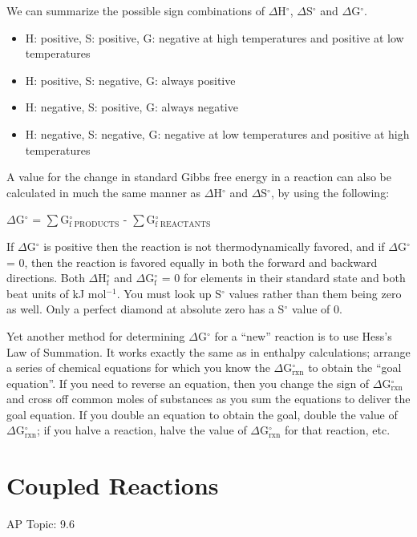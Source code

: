 \documentclass[../chem.tex]{subfiles}
\begin{document}
We can summarize the possible sign combinations of $\Delta$H$^{\circ}$, $\Delta$S$^{\circ}$ and $\Delta$G$^{\circ}$.
\begin{itemize}
    \item H: positive, S: positive, G: negative at high temperatures and positive at low temperatures 
    \item H: positive, S: negative, G: always positive 
    \item H: negative, S: positive, G: always negative 
    \item H: negative, S: negative, G: negative at low temperatures and positive at high temperatures
\end{itemize}

A value for the change in standard Gibbs free energy in a reaction can also be calculated in much the same manner as $\Delta$H$^{\circ}$ and $\Delta$S$^{\circ}$, by using the following:
\begin{center}
    $\Delta$G$^{\circ}$ = $\sum$G$^{\circ}_{\text{f PRODUCTS}}$ - $\sum$G$^{\circ}_{\text{f REACTANTS}}$
\end{center}

If $\Delta$G$^{\circ}$ is positive then the reaction is not thermodynamically favored, and if $\Delta$G$^{\circ}$ = 0, then the reaction is favored equally 
in both the forward and backward directions. Both $\Delta$H$_{\text{f}}^{\circ}$ and $\Delta$G$_{\text{f}}^{\circ}$ = 0 for elements in their standard state and both beat units of kJ mol$^{-1}$.
You must look up S$^{\circ}$ values rather than them being zero as well. Only a perfect diamond at absolute zero has a S$^{\circ}$ value of 0.

Yet another method for determining $\Delta$G$^{\circ}$ for a ``new'' reaction is to use Hess's Law of Summation. It works exactly the same as in enthalpy calculations;
arrange a series of chemical equations for which you know the $\Delta$G$^{\circ}_{\text{rxn}}$ to obtain the ``goal equation''. If you need to reverse an equation,
then you change the sign of $\Delta$G$^{\circ}_{\text{rxn}}$ and cross off common moles of substances as you sum the equations to deliver the goal equation. 
If you double an equation to obtain the goal, double the value of $\Delta$G$^{\circ}_{\text{rxn}}$; if you halve a reaction, halve the value of $\Delta$G$^{\circ}_{\text{rxn}}$ for that reaction, etc.
\section{Coupled Reactions}
AP Topic: 9.6
\end{document}
